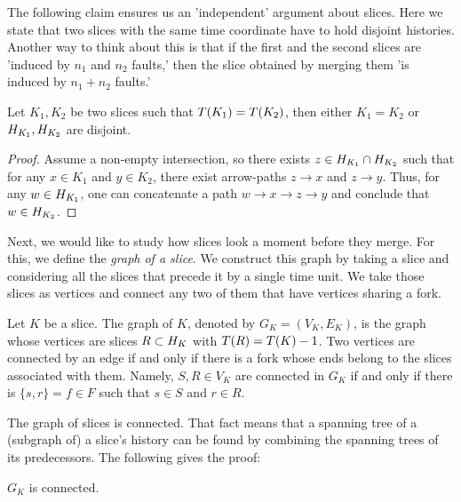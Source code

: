 The following claim ensures us an 'independent' argument about slices. Here we state that two slices with the same time coordinate have to hold disjoint histories. Another way to think about this is that if the first and the second slices are 'induced by $n_{1}$ and $n_{2}$ faults,' then the slice obtained by merging them 'is induced by $n_{1}+n_{2}$ faults.'
  \begin{claim} 
    \label{claim:disj}
    Let $K_{1}, K_{2}$ be two slices such that $T(K_1) = T(K_2)$, then either $K_{1}=K_{2}$ or $H_{K_1}, H_{K_2}$ are disjoint.
  \end{claim}
  \begin{proof}
Assume a non-empty intersection, so there exists $z \in H_{K_{1}}\cap H_{K_{2}}$ such that for any $x \in K_{1}$ and $y \in K_{2}$, there exist arrow-paths $z \rightarrow x$ and $z \rightarrow y$. Thus, for any $w \in H_{K_{1}}$, one can concatenate a path $w \rightarrow x \rightarrow z \rightarrow y$ and conclude that $w \in H_{K_{2}}$.
  \end{proof}
  

Next, we would like to study how slices look a moment before they merge. For this, we define the \textit{graph of a slice}. We construct this graph by taking a slice and considering all the slices that precede it by a single time unit. We take those slices as vertices and connect any two of them that have vertices sharing a fork.
  \begin{definition}
    \label{def:gslice}
    Let $K$ be a slice. The graph of $K$, denoted by $G_{K} = (V_{K}, E_{K})$, is the graph whose vertices are slices $R \subset H_{K}$ with $T(R) = T(K) - 1$. Two vertices are connected by an edge if and only if there is a fork whose ends belong to the slices associated with them. Namely, $S, R \in V_{K}$ are connected in $G_{K}$ if and only if there is $\{s, r\} = f \in F$ such that $s \in S$ and $r \in R$.
  \end{definition}

  
  The graph of slices is connected. That fact means that a spanning tree of a (subgraph of) a slice's history can be found by combining the spanning trees of its predecessors. The following gives the proof:
  \begin{claim}
    \label{claim:connected}
    $G_{K}$ is connected. 
  \end{claim}


